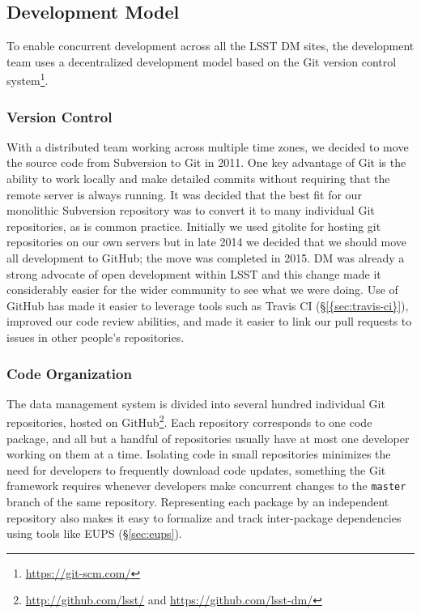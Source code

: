 \subsection{Development Model}\label{sec:development}

To enable concurrent development across all the LSST DM sites, the development team uses a decentralized development model based on the Git version control system\footnote{\url{https://git-scm.com/}}.

\subsubsection{Version Control}\label{sec:git}\label{sec:subversion}

With a distributed team working across multiple time zones, we decided to  move the  source code from Subversion to Git in 2011.
One key advantage of Git  is the ability to work locally and make detailed commits without requiring that the remote server is always running.
It was decided that the best fit for our monolithic Subversion repository was to convert it to many individual Git repositories, as is common practice.
Initially we used gitolite for hosting git repositories on our own servers but in late 2014 we decided that we should move all development to GitHub\cite{Document-17187}; the move was completed in 2015.
DM was already a strong advocate of open development within LSST and this change made it considerably easier for the wider community to see what we were doing.
Use of GitHub  has made it easier to leverage tools such as Travis CI (\S\ref{{sec:travis-ci}}), improved our code review abilities, and made it easier to link our pull requests to issues in other people's repositories.

\subsubsection{Code Organization}\label{sec:git_repositories}

The data management system is divided into several hundred individual Git repositories, hosted on GitHub\footnote{\url{http://github.com/lsst/} and \url{https://github.com/lsst-dm/}}.
Each repository corresponds to one code package, and all but a handful of repositories usually have at most one developer working on them at a time.
Isolating code in small repositories minimizes the need for developers to frequently download code updates, something the Git framework requires whenever developers make concurrent changes to the \texttt{master} branch of the same repository.
Representing each package by an independent repository also makes it easy to formalize and track inter-package dependencies using tools like EUPS (\S\ref{sec:eups}).


